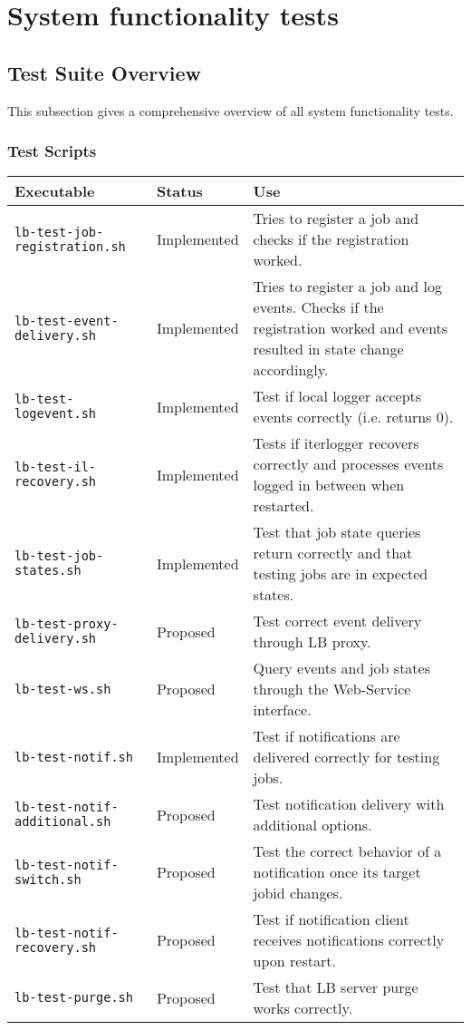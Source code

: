 
\section{System functionality tests}
\label{s:functionality}

\subsection{Test Suite Overview}

This subsection gives a comprehensive overview of all system functionality tests.

\subsubsection{Test Scripts}

\begin{tabularx}{\textwidth}{|l|l|X|}
\hline
     {\bf Executable} & {\bf Status} & {\bf Use} \\
\hline
{\tt lb-test-job-registration.sh} & Implemented & Tries to register a job and checks if the registration worked. \\
\hline
{\tt lb-test-event-delivery.sh} & Implemented & Tries to register a job and log events. Checks if the registration worked and events resulted in state change accordingly. \\
\hline
{\tt lb-test-logevent.sh} & Implemented & Test if local logger accepts events correctly (i.e. returns 0). \\
\hline
{\tt lb-test-il-recovery.sh} & Implemented & Tests if iterlogger recovers correctly and processes events logged in between when restarted. \\
\hline
{\tt lb-test-job-states.sh} & Implemented & Test that job state queries return correctly and that testing jobs are in expected states. \\
\hline
{\tt lb-test-proxy-delivery.sh} & Proposed & Test correct event delivery through LB proxy. \\
\hline
{\tt lb-test-ws.sh} & Proposed & Query events and job states through the Web-Service interface. \\
\hline
{\tt lb-test-notif.sh} & Implemented & Test if notifications are delivered correctly for testing jobs. \\
\hline
{\tt lb-test-notif-additional.sh} & Proposed & Test notification delivery with additional options. \\
\hline
{\tt lb-test-notif-switch.sh} & Proposed & Test the correct behavior of a notification once its target jobid changes.  \\
\hline
{\tt lb-test-notif-recovery.sh} & Proposed & Test if notification client receives notifications correctly upon restart.  \\
\hline
{\tt lb-test-purge.sh} & Proposed & Test that LB server purge works correctly. \\
\hline
\end{tabularx}

